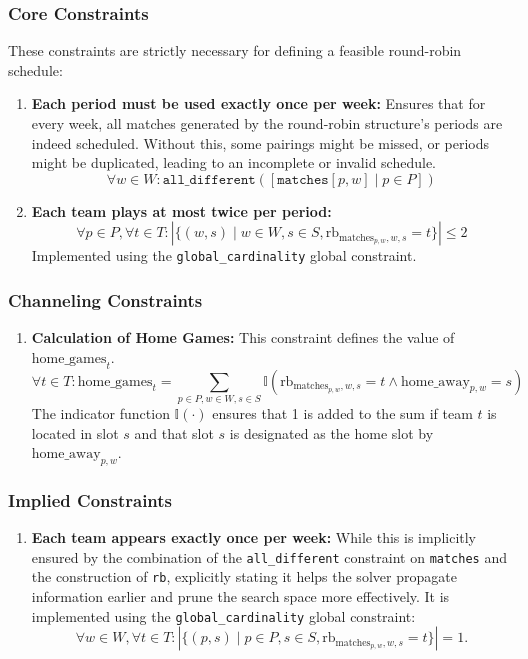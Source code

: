 \subsubsection{Core Constraints}
These constraints are strictly necessary for defining a feasible round-robin schedule:
\begin{enumerate}
    \item \textbf{Each period must be used exactly once per week:} Ensures that for every week, all matches generated by the round-robin structure's periods are indeed scheduled. Without this, some pairings might be missed, or periods might be duplicated, leading to an incomplete or invalid schedule.
    \[ \forall w \in W : \texttt{all\_different}([\texttt{matches}[p, w] \mid p \in P]) \]

    \item \textbf{Each team plays at most twice per period:} 
\[ \forall p \in P, \forall t \in T : \left| \{ (w, s) \mid w \in W, s \in S, \text{rb}_{\text{matches}_{p, w}, w, s} = t \} \right| \leq 2 \]
Implemented using the \texttt{global\_cardinality} global constraint.

\end{enumerate}

\subsubsection{Channeling Constraints}
\begin{enumerate}
 \item \textbf{Calculation of Home Games:} This constraint defines the value of $\text{home\_games}_{t}$.
\[ \forall t \in T : \text{home\_games}_{t} = \sum_{p \in P, w \in W, s \in S} \mathbb{I}\left( \text{rb}_{\text{matches}_{p, w}, w, s} = t \land \text{home\_away}_{p, w} = s \right) \]
The indicator function $\mathbb{I}(\cdot)$ ensures that 1 is added to the sum if team $t$ is located in slot $s$ and that slot $s$ is designated as the home slot by $\text{home\_away}_{p,w}$.
\end{enumerate}


\subsubsection{Implied Constraints}
\begin{enumerate}
   \item \textbf{Each team appears exactly once per week:}  While this is implicitly ensured by the combination of the \texttt{all\_different} constraint on \texttt{matches} and the construction of \texttt{rb}, explicitly stating it helps the solver propagate information earlier and prune the search space more effectively.  It is implemented using the \texttt{global\_cardinality} global constraint:
    \[
     \forall w \in W, \forall t \in T : \left| \{ (p, s) \mid p \in P, s \in S, \text{rb}_{\text{matches}_{p, w}, w, s} = t \} \right| = 1.
 \]
\end{enumerate}



